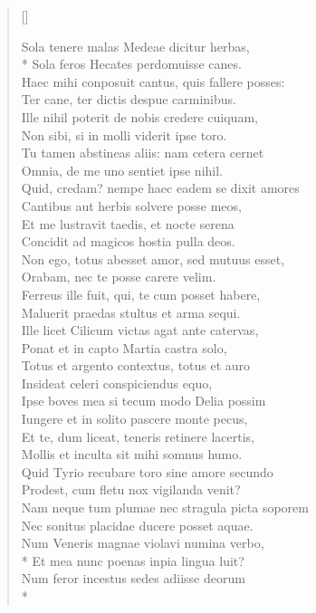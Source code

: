 \begin{verse}[\versewidth]
\begin{altverse}
{Sola tenere malas Medeae dicitur herbas,\\*
Sola feros Hecates perdomuisse canes.\\
Haec mihi conposuit cantus, quis fallere posses:\\
Ter cane, ter dictis despue carminibus.\\
Ille nihil poterit de nobis credere cuiquam,\\
Non sibi, si in molli viderit ipse toro.\\
Tu tamen abstineas aliis: nam cetera cernet\\
Omnia, de me uno sentiet ipse nihil.\\
Quid, credam? nempe haec eadem se dixit amores\\
Cantibus aut herbis solvere posse meos,\\
Et me lustravit taedis, et nocte serena\\
Concidit ad magicos hostia pulla deos.\\
Non ego, totus abesset amor, sed mutuus esset,\\
Orabam, nec te posse carere velim.\\
Ferreus ille fuit, qui, te cum posset habere,\\
Maluerit praedas stultus et arma sequi.\\
Ille licet Cilicum victas agat ante catervas,\\
Ponat et in capto Martia castra solo,\\
Totus et argento contextus, totus et auro\\
Insideat celeri conspiciendus equo,\\
Ipse boves mea si tecum modo Delia possim\\
Iungere et in solito pascere monte pecus,\\
Et te, dum liceat, teneris retinere lacertis,\\
Mollis et inculta sit mihi somnus humo.\\
Quid Tyrio recubare toro sine amore secundo\\
Prodest, cum fletu nox vigilanda venit?\\
Nam neque tum plumae nec stragula picta soporem\\
Nec sonitus placidae ducere posset aquae.\\
Num Veneris magnae violavi numina verbo,\\*
Et mea nunc poenas inpia lingua luit?\\
Num feror incestus sedes adiisse deorum\\*
}
\end{altverse}
\end{verse}
